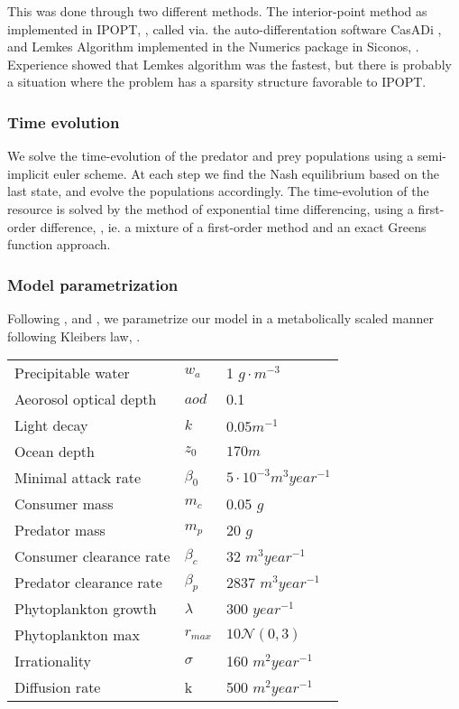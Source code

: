 This was done through two different methods. The interior-point method as implemented in IPOPT, \citep{wachter2006implementation}, called via. the auto-differentation software CasADi \citep{Andersson2019}, and Lemkes Algorithm implemented in the Numerics package in Siconos, \citep{acary2019introduction}. Experience showed that Lemkes algorithm was the fastest, but there is probably a situation where the problem has a sparsity structure favorable to IPOPT.

\subsubsection*{Time evolution}

We solve the time-evolution of the predator and prey populations using a semi-implicit euler scheme. At each step we find the Nash equilibrium based on the last state, and evolve the populations accordingly. The time-evolution of the resource is solved by the method of exponential time differencing, using a first-order difference, \citep{hochbruck2010exponential}, ie. a mixture of a first-order method and an exact Greens function approach.

\subsubsection*{Model parametrization}
Following \citep{yodzis1991}, and \citep{kha_2019}, we parametrize our model in a metabolically scaled manner following Kleibers law, \citep{kleiber}.


\begin{tabular}{l | l | l}
  Precipitable water & $w_a$ & 1 $g \cdot m^{-3}$\\
  Aeorosol optical depth & $aod$ & 0.1 \\
  Light decay & $k$ & $0.05 m^{-1}$\\
  Ocean depth & $z_0$ & $170 m$ \\
  Minimal attack rate & $\beta_0$ & $5 \cdot 10^{-3} m^{3} year^{-1}$ \\
  Consumer mass & $m_c$ & 0.05 $g$ \\
  Predator mass & $m_p$ & 20 $g$ \\
  Consumer clearance rate & $\beta_c$ & 32 $m^{3} year^{-1}$ \\
  Predator clearance rate & $\beta_p$ & 2837 $m^3 year^{-1}$ \\
  Phytoplankton growth & $\lambda$ & 300 $year^{-1}$ \\
  Phytoplankton max & $r_{max}$ & $10\mathcal{N}(0,3)$ \\
  Irrationality & $\sigma$ & 160 $m^2 year^{-1}$ \\
  Diffusion rate & k & 500 $m^{2} year^{-1}$
\end{tabular}
